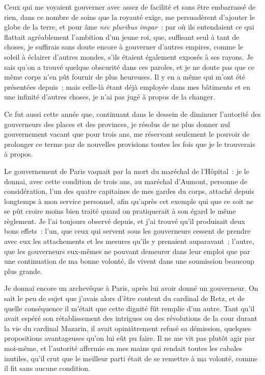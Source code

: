\documentclass[french,twoside]{book} %
\begin{document}
Ceux qui me voyaient gouverner avec assez de facilité et sans être embarrassé de rien, dans ce nombre de soins que la royauté exige, me persuadèrent d’ajouter le globe de la terre, et pour âme {\itshape nec pluribus impar} : par où ils entendaient ce qui flattait agréablement l’ambition d’un jeune roi, que, suffisant seul à tant de choses, je suffirais sans doute encore à gouverner d’autres empires, comme le soleil à éclairer d’autres mondes, s’ils étaient également exposés à ses rayons. Je sais qu’on a trouvé quelque obscurité dans ces paroles, et je ne doute pas que ce même corps n’en pût fournir de plus heureuses. Il y en a même qui m’ont été présentées depuis ; mais celle-là étant déjà employée dans mes bâtiments et en une infinité d’autres choses, je n’ai pas jugé à propos de la changer.\par
Ce fut aussi cette année que, continuant dans le dessein de diminuer l’autorité des gouverneurs des places et des provinces, je résolus de ne plus donner nul gouvernement vacant que pour trois ans, me réservant seulement le pouvoir de prolonger ce terme par de nouvelles provisions toutes les fois que je le trouverais à propos.\par
Le gouvernement de Paris vaquait par la mort du maréchal de l’Hôpital : je le donnai, avec cette condition de trois ans, au maréchal d’Aumont, personne de considération, l’un des quatre capitaines de mes gardes du corps, attaché depuis longtemps à mon service personnel, afin qu’après cet exemple qui que ce soit ne se pût croire moins bien traité quand on pratiquerait à son égard le même règlement. Je l’ai toujours observé depuis, et j’ai trouvé qu’il produisait deux bons effets : l’un, que ceux qui servent sous les gouverneurs cessent de prendre avec eux les attachements et les mesures qu’ils y prenaient auparavant ; l’autre, que les gouverneurs eux-mêmes ne pouvant demeurer dans leur emploi que par une continuation de ma bonne volonté, ils vivent dans une soumission beaucoup plus grande.\par
Je donnai encore un archevêque à Paris, après lui avoir donné un gouverneur. On sait le peu de sujet que j’avais alors d’être content du cardinal de Retz, et de quelle conséquence il m’était que cette dignité fût remplie d’un autre. Tant qu’il avait espéré son rétablissement des intrigues ou des révolutions de la cour durant la vie du cardinal Mazarin, il avait opiniâtrement refusé sa démission, quelques propositions avantageuses qu’on lui eût pu faire. Il ne me vit pas plutôt agir par moi-même, et l’autorité affermie en mes mains qui rendait toutes les cabales inutiles, qu’il crut que le meilleur parti était de se remettre à ma volonté, comme il fit sans aucune condition.\par
\end{document}
